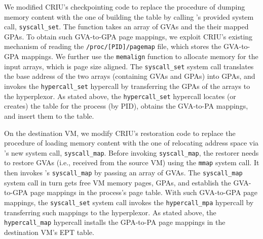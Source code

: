 We  modified CRIU's checkpointing code to replace the procedure of dumping memory content with the one of building the \arch table by calling \arch's provided system call, \texttt{syscall\_set}. The function takes an array of GVAs and the their mapped GPAs. To obtain such GVA-to-GPA page mappings, we exploit CRIU's existing mechanism of reading the \texttt{/proc/[PID]/pagemap} file, which stores the GVA-to-GPA mappings. 
We further use the \texttt{memalign} function to allocate memory for the input arrays, which is page size aligned. The \texttt{syscall\_set} system call translates the base address of the two arrays (containing GVAs and GPAs) into GPAs, and invokes the \texttt{hypercall\_set} hypercall by transferring the GPAs of the arrays to the hyperplexor.  As stated above, the \texttt{hypercall\_set} hypercall locates (or creates) the \arch table for the process (by PID), obtains the GVA-to-PA mappings, and insert them to the \arch table.

 On the destination VM, we modify CRIU's restoration code to replace the procedure of loading memory content with the one of relocating address space via \arch's new system call, \texttt{syscall\_map}. Before invoking  \texttt{syscall\_map}, the restorer needs to restore GVAs (i.e., received from the source VM) using the \texttt{mmap} system call. It then invokes \arch's \texttt{syscall\_map} by passing an array of GVAs. The \texttt{syscall\_map} system call in turn gets free VM memory pages, GPAs, and establish the GVA-to-GPA page mappings in the process's page table. With such GVA-to-GPA page mappings, the \texttt{syscall\_set} system call invokes the \texttt{hypercall\_mpa} hypercall by transferring such mappings to the hyperplexor. As stated above, the \texttt{hypercall\_map} hypercall installs the GPA-to-PA page mappings in the destination VM's EPT table.

